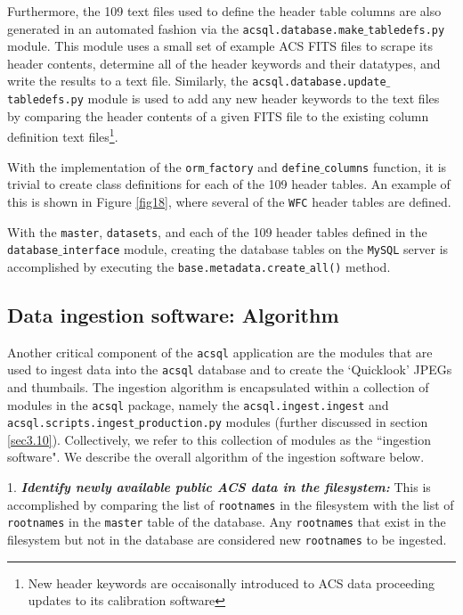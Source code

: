 \documentclass[10pt,journal,compsoc]{IEEEtran}
\begin{document}
Furthermore, the 109 text files used to define the header table columns are also generated in an automated fashion via the \texttt{acsql.database.make$\_$tabledefs.py} module.  This
module uses a small set of example ACS FITS files to scrape its header contents, determine all of the header keywords and their datatypes, and write the results to a text file.
Similarly, the \texttt{acsql.database.update$\_$tabledefs.py} module is used to add any new header keywords to the text files by comparing the header contents of a given FITS file to
the existing column definition text files\footnote{New header keywords are occaisonally introduced to ACS data proceeding updates to its calibration software}.

With the implementation of the \texttt{orm$\_$factory} and \texttt{define$\_$columns} function, it is trivial to create class definitions for each of the 109 header tables.  An
example of this is shown in Figure \ref{fig18}, where several of the \texttt{WFC} header tables are defined.

With the \texttt{master}, \texttt{datasets}, and each of the 109 header tables defined in the \texttt{database$\_$interface} module, creating the database tables on the \texttt{MySQL}
server is accomplished by executing the \texttt{base.metadata.create$\_$all()} method.


\subsection{Data ingestion software: Algorithm} \label{sec3.7}

Another critical component of the \texttt{acsql} application are the modules that are used to ingest data into the \texttt{acsql} database and to create the `Quicklook' JPEGs and
thumbails. The ingestion algorithm is encapsulated within a collection of modules in the \texttt{acsql} package, namely the \texttt{acsql.ingest.ingest} and
\texttt{acsql.scripts.ingest$\_$production.py} modules (further discussed in section \ref{sec3.10}).  Collectively, we refer to this collection of modules as the ``ingestion software".
We describe the overall algorithm of the ingestion software below.

1. \textbf{\textit{Identify newly available public ACS data in the filesystem:}}  This is accomplished by comparing the list of \texttt{rootnames} in the filesystem with the list
of \texttt{rootnames} in the \texttt{master} table of the database.  Any \texttt{rootnames} that exist in the filesystem but not in the database are considered new \texttt{rootnames} to
be ingested.
\end{document}
